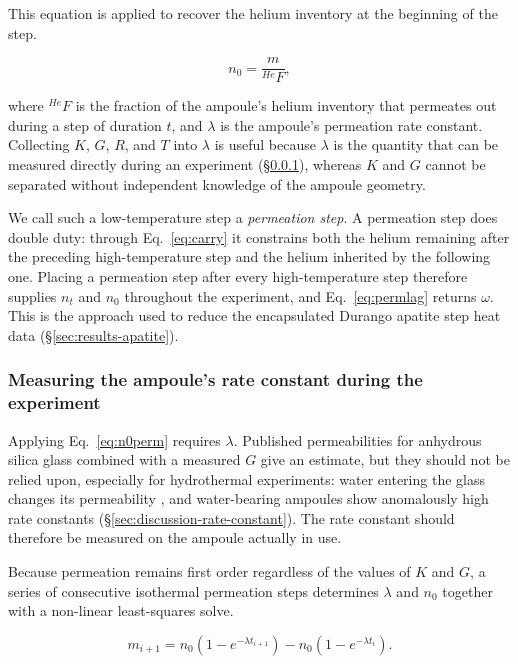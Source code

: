This equation is applied to recover the helium inventory at the beginning of the step.

\begin{equation}
\label{eq:n0perm}
n_{0} = \frac{m}{^{He}F} ,
\end{equation}

where $^{He}F$ is the fraction of the ampoule's helium inventory that permeates out during a step of duration $t$, and $\lambda$ is the ampoule's permeation rate constant. Collecting $K$, $G$, $R$, and $T$ into $\lambda$ is useful because $\lambda$ is the quantity that can be measured directly during an experiment (\S\ref{sec:rate-constant}), whereas $K$ and $G$ cannot be separated without independent knowledge of the ampoule geometry.
 
We call such a low-temperature step a \emph{permeation step}. A permeation step does double duty: through Eq.~\eqref{eq:carry} it constrains both the helium remaining after the preceding high-temperature step and the helium inherited by the following one. Placing a permeation step after every high-temperature step therefore supplies $n_{t}$ and $n_{0}$ throughout the experiment, and Eq.~\eqref{eq:permlag} returns $\omega$. This is the approach used to reduce the encapsulated Durango apatite step heat data (\S\ref{sec:results-apatite}).

\subsubsection{Measuring the ampoule's rate constant during the experiment}\label{sec:rate-constant}

Applying Eq.~\eqref{eq:n0perm} requires $\lambda$. Published permeabilities for anhydrous silica glass \citep{norton1953,altemose1961,swets1961,masaryk1968} combined with a measured $G$ give an estimate, but they should not be relied upon, especially for hydrothermal experiments: water entering the glass changes its permeability \citep{shelby1972,tsuru2011}, and water-bearing ampoules show anomalously high rate constants (\S\ref{sec:discussion-rate-constant}). The rate constant should therefore be measured on the ampoule actually in use.

Because permeation remains first order regardless of the values of $K$ and $G$, a series of consecutive isothermal permeation steps determines $\lambda$ and $n_{0}$ together with a non-linear least-squares solve.

\begin{equation}
\label{eq:incyield}
m_{i+1} = n_{0}\left(1 - e^{-\lambda t_{i+1}}\right) - n_{0}\left(1 - e^{-\lambda t_{i}}\right) .
\end{equation}

